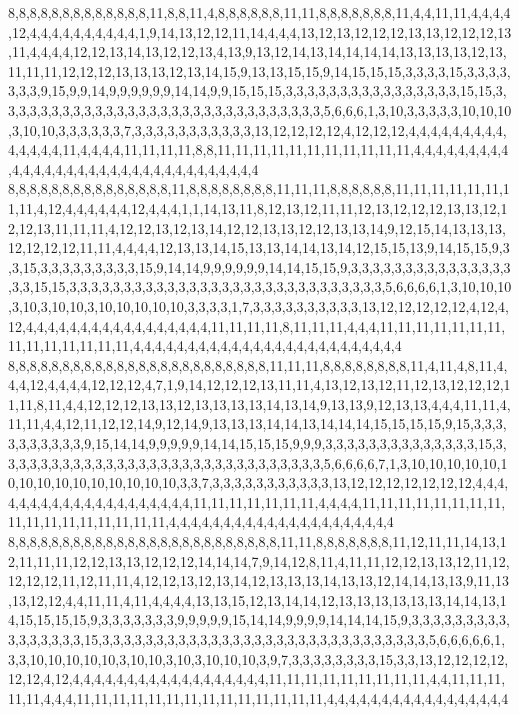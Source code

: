 8,8,8,8,8,8,8,8,8,8,8,8,8,11,8,8,11,4,8,8,8,8,8,8,11,11,8,8,8,8,8,8,8,11,4,4,11,11,4,4,4,4,12,4,4,4,4,4,4,4,4,4,4,1,9,14,13,12,12,11,14,4,4,4,13,12,13,12,12,12,13,13,12,12,12,13,11,4,4,4,4,12,12,13,14,13,12,12,13,4,13,9,13,12,14,13,14,14,14,14,13,13,13,13,12,13,11,11,11,12,12,12,13,13,13,12,13,14,15,9,13,13,15,15,9,14,15,15,15,3,3,3,3,15,3,3,3,3,3,3,3,9,15,9,9,14,9,9,9,9,9,9,14,14,9,9,15,15,15,3,3,3,3,3,3,3,3,3,3,3,3,3,3,3,3,15,15,3,3,3,3,3,3,3,3,3,3,3,3,3,3,3,3,3,3,3,3,3,3,3,3,3,3,3,3,3,3,5,6,6,6,1,3,10,3,3,3,3,3,10,10,10,3,10,10,3,3,3,3,3,3,7,3,3,3,3,3,3,3,3,3,3,3,13,12,12,12,12,4,12,12,12,4,4,4,4,4,4,4,4,4,4,4,4,4,4,11,4,4,4,4,11,11,11,11,8,8,11,11,11,11,11,11,11,11,11,11,11,4,4,4,4,4,4,4,4,4,4,4,4,4,4,4,4,4,4,4,4,4,4,4,4,4,4,4,4,4,4,4,4
8,8,8,8,8,8,8,8,8,8,8,8,8,8,8,11,8,8,8,8,8,8,8,8,11,11,11,8,8,8,8,8,8,11,11,11,11,11,11,11,11,4,12,4,4,4,4,4,4,12,4,4,4,1,1,14,13,11,8,12,13,12,11,11,12,13,12,12,12,13,13,12,12,12,13,11,11,11,4,12,12,13,12,13,14,12,12,13,13,12,12,13,13,14,9,12,15,14,13,13,13,12,12,12,12,11,11,4,4,4,4,12,13,13,14,15,13,13,14,14,13,14,12,15,15,13,9,14,15,15,9,3,3,15,3,3,3,3,3,3,3,3,3,15,9,14,14,9,9,9,9,9,9,14,14,15,15,9,3,3,3,3,3,3,3,3,3,3,3,3,3,3,3,3,3,15,15,3,3,3,3,3,3,3,3,3,3,3,3,3,3,3,3,3,3,3,3,3,3,3,3,3,3,3,3,3,5,6,6,6,6,1,3,10,10,10,3,10,3,10,10,3,10,10,10,10,10,3,3,3,3,1,7,3,3,3,3,3,3,3,3,3,3,13,12,12,12,12,12,4,12,4,12,4,4,4,4,4,4,4,4,4,4,4,4,4,4,4,4,4,11,11,11,11,8,11,11,11,4,4,4,11,11,11,11,11,11,11,11,11,11,11,11,11,11,4,4,4,4,4,4,4,4,4,4,4,4,4,4,4,4,4,4,4,4,4,4,4,4,4
8,8,8,8,8,8,8,8,8,8,8,8,8,8,8,8,8,8,8,8,8,8,8,8,11,11,11,8,8,8,8,8,8,8,8,11,4,11,4,8,11,4,4,4,12,4,4,4,4,12,12,12,4,7,1,9,14,12,12,12,13,11,11,4,13,12,13,12,11,12,13,12,12,12,11,11,8,11,4,4,12,12,12,13,13,12,13,13,13,13,14,13,14,9,13,13,9,12,13,13,4,4,4,11,11,4,11,11,4,4,12,11,12,12,14,9,12,14,9,13,13,13,14,14,13,14,14,14,15,15,15,15,9,15,3,3,3,3,3,3,3,3,3,3,9,15,14,14,9,9,9,9,9,14,14,15,15,15,9,9,9,3,3,3,3,3,3,3,3,3,3,3,3,3,3,15,3,3,3,3,3,3,3,3,3,3,3,3,3,3,3,3,3,3,3,3,3,3,3,3,3,3,3,3,3,3,5,6,6,6,6,7,1,3,10,10,10,10,10,10,10,10,10,10,10,10,10,10,10,3,3,7,3,3,3,3,3,3,3,3,3,3,3,13,12,12,12,12,12,12,12,4,4,4,4,4,4,4,4,4,4,4,4,4,4,4,4,4,4,4,4,11,11,11,11,11,11,11,4,4,4,4,11,11,11,11,11,11,11,11,11,11,11,11,11,11,11,11,11,4,4,4,4,4,4,4,4,4,4,4,4,4,4,4,4,4,4,4,4,4
8,8,8,8,8,8,8,8,8,8,8,8,8,8,8,8,8,8,8,8,8,8,8,8,8,11,11,8,8,8,8,8,8,8,11,12,11,11,14,13,12,11,11,11,12,12,13,13,12,12,12,14,14,14,7,9,14,12,8,11,4,11,11,12,12,13,13,12,11,12,12,12,12,11,12,11,11,4,12,12,13,12,13,14,12,13,13,13,14,13,13,12,14,14,13,13,9,11,13,13,12,12,4,4,11,11,4,11,4,4,4,4,13,13,15,12,13,14,14,12,13,13,13,13,13,13,14,14,13,14,15,15,15,15,9,3,3,3,3,3,3,3,9,9,9,9,9,15,14,14,9,9,9,9,14,14,14,15,9,3,3,3,3,3,3,3,3,3,3,3,3,3,3,3,3,15,3,3,3,3,3,3,3,3,3,3,3,3,3,3,3,3,3,3,3,3,3,3,3,3,3,3,3,3,3,3,5,6,6,6,6,6,1,3,3,10,10,10,10,10,3,10,10,3,10,3,10,10,10,3,9,7,3,3,3,3,3,3,3,3,15,3,3,13,12,12,12,12,12,12,4,12,4,4,4,4,4,4,4,4,4,4,4,4,4,4,4,4,4,4,11,11,11,11,11,11,11,11,11,4,4,11,11,11,11,11,4,4,4,11,11,11,11,11,11,11,11,11,11,11,11,11,11,4,4,4,4,4,4,4,4,4,4,4,4,4,4,4,4,4
